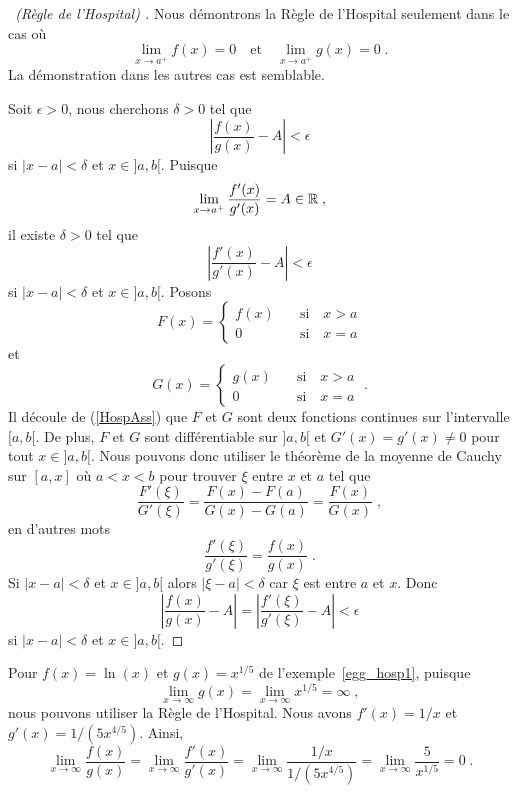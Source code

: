 {\begin{proof}[\UOproof\ (Règle de l'Hospital) \theory]
Nous démontrons la Règle de l'Hospital seulement dans le cas où
\begin{equation}\label{HospAss}
\lim_{x\rightarrow a^+} f(x) = 0 \quad \text{et} \quad
\lim_{x\rightarrow a^+} g(x) = 0 \; .
\end{equation}
La démonstration dans les autres cas est semblable.

Soit $\epsilon>0$, nous cherchons $\delta >0$ tel que
\[
\left| \frac{f(x)}{g(x)} - A \right| < \epsilon
\]
si $|x-a| < \delta$ et $x\in ]a,b[$.  Puisque
\[
\lim_{x\rightarrow a^+} \frac{f'(x)}{g'(x)} = A \in \mathbb{R} \; ,
\]
il existe $\delta >0$ tel que
\[
\left| \frac{f'(x)}{g'(x)} - A \right| < \epsilon
\]
si $|x-a|< \delta$ et $x\in ]a,b[$.  Posons
\[
F(x) = \begin{cases} f(x) & \quad \text{si} \quad x > a \\
0 & \quad \text{si}\quad  x=a
\end{cases}
\]
et
\[
G(x) = \begin{cases} g(x) & \quad \text{si} \quad x > a \\
0 & \quad \text{si}\quad  x=a
\end{cases} \; .
\]
Il découle de (\ref{HospAss}) que $F$ et $G$ sont deux fonctions
continues sur l'intervalle $[a,b[$.  De plus, $F$ et $G$ sont
différentiable sur $]a,b[$ et $G'(x) = g'(x) \neq 0$ pour tout
$x\in ]a,b[$.  Nous pouvons donc utiliser le théorème de la moyenne de
Cauchy sur $[a,x]$ où $a<x<b$ pour trouver $\xi$ entre $x$ et $a$ tel
que
\[
\frac{F'(\xi)}{G'(\xi)} = \frac{F(x)-F(a)}{G(x)-G(a)} =
\frac{F(x)}{G(x)} \; ,
\]
en d'autres mots
\[
\frac{f'(\xi)}{g'(\xi)} = \frac{f(x)}{g(x)} \; .
\]
Si $|x-a| < \delta$ et $x\in ]a,b[$ alors $|\xi-a| < \delta$ car $\xi$
est entre $a$ et $x$.  Donc
\[
\left| \frac{f(x)}{g(x)} - A \right| =
\left| \frac{f'(\xi)}{g'(\xi)} - A \right| < \epsilon
\]
si $|x-a| < \delta$ et $x \in ]a,b[$.
\end{proof}

\begin{egg}
Pour $f(x) = \ln(x)$ et $g(x)= x^{1/5}$ de l'exemple~\ref{egg_hosp1},
puisque
\[
\lim_{x\rightarrow \infty} g(x) = \lim_{x\rightarrow \infty} x^{1/5}
= \infty \; ,
\]
nous pouvons utiliser la Règle de l'Hospital.  Nous avons $f'(x) = 1/x$ et
$g'(x) = 1/(5x^{4/5})$.  Ainsi,
\[
\lim_{x\rightarrow \infty} \frac{f(x)}{g(x)}
= \lim_{x\rightarrow \infty} \frac{f'(x)}{g'(x)}
= \lim_{x\rightarrow \infty} \frac{1/x}{1/(5x^{4/5})}
=  \lim_{x\rightarrow \infty} \frac{5}{x^{1/5}} = 0 \; .
\]
\end{egg}

}
